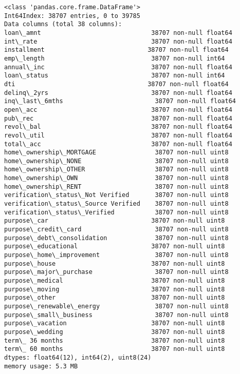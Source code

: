 \documentclass[11pt]{article}
\begin{document}
    \begin{Verbatim}[commandchars=\\\{\}]
<class 'pandas.core.frame.DataFrame'>
Int64Index: 38707 entries, 0 to 39785
Data columns (total 38 columns):
loan\_amnt                              38707 non-null float64
int\_rate                               38707 non-null float64
installment                            38707 non-null float64
emp\_length                             38707 non-null int64
annual\_inc                             38707 non-null float64
loan\_status                            38707 non-null int64
dti                                    38707 non-null float64
delinq\_2yrs                            38707 non-null float64
inq\_last\_6mths                         38707 non-null float64
open\_acc                               38707 non-null float64
pub\_rec                                38707 non-null float64
revol\_bal                              38707 non-null float64
revol\_util                             38707 non-null float64
total\_acc                              38707 non-null float64
home\_ownership\_MORTGAGE                38707 non-null uint8
home\_ownership\_NONE                    38707 non-null uint8
home\_ownership\_OTHER                   38707 non-null uint8
home\_ownership\_OWN                     38707 non-null uint8
home\_ownership\_RENT                    38707 non-null uint8
verification\_status\_Not Verified       38707 non-null uint8
verification\_status\_Source Verified    38707 non-null uint8
verification\_status\_Verified           38707 non-null uint8
purpose\_car                            38707 non-null uint8
purpose\_credit\_card                    38707 non-null uint8
purpose\_debt\_consolidation             38707 non-null uint8
purpose\_educational                    38707 non-null uint8
purpose\_home\_improvement               38707 non-null uint8
purpose\_house                          38707 non-null uint8
purpose\_major\_purchase                 38707 non-null uint8
purpose\_medical                        38707 non-null uint8
purpose\_moving                         38707 non-null uint8
purpose\_other                          38707 non-null uint8
purpose\_renewable\_energy               38707 non-null uint8
purpose\_small\_business                 38707 non-null uint8
purpose\_vacation                       38707 non-null uint8
purpose\_wedding                        38707 non-null uint8
term\_ 36 months                        38707 non-null uint8
term\_ 60 months                        38707 non-null uint8
dtypes: float64(12), int64(2), uint8(24)
memory usage: 5.3 MB

    \end{Verbatim}
\end{document}
